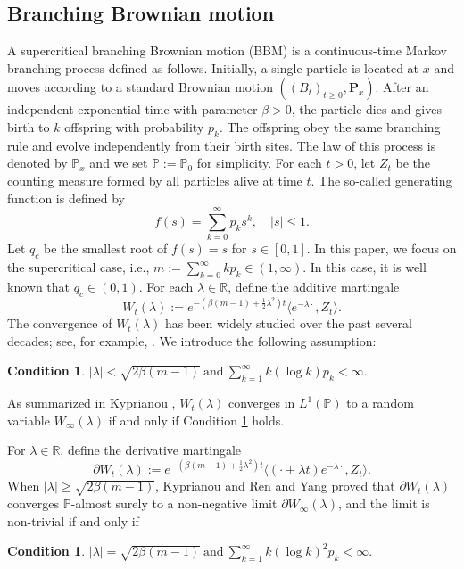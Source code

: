 \documentclass[11pt]{article}
\newtheorem{con1}[con0]{Condition}
\numberwithin{equation}{section}
\def\bgcondition{\begin{con1}}\def\edcondition{\end{con1}}
\begin{document}
\subsection{Branching Brownian motion}


A supercritical branching Brownian motion (BBM) is a continuous-time Markov branching process defined as follows. Initially, a single particle is located at $x$ and moves according to a standard Brownian motion $((B_t)_{t \geq 0}, \mathbf{P}_x)$. After an independent exponential time with parameter $\beta > 0$, the particle dies and gives birth to $k$ offspring with probability $p_k$. The offspring obey the same branching rule and evolve independently from their birth sites. The law of this process is denoted by $\mathbb{P}_x$ and we set $\mathbb{P}:= \mathbb{P}_0$ for simplicity. For each $t > 0$, let $Z_t$ be the counting measure formed by all particles alive at time 
$t$.
The so-called generating function is defined by
$$
f(s)=\sum_{k=0}^\infty p_k s^k,\quad |s|\le1.
$$
Let $q_c$ be the smallest root of $f(s)=s$ for $s\in[0,1]$. In this paper, we focus on the supercritical case, i.e., $m := \sum_{k=0}^\infty k p_k \in (1, \infty)$. In this case, it is well known that $q_c\in(0,1)$.
For each $\lambda \in \mathbb{R}$, define the additive martingale
\[
W_t(\lambda) := e^{-(\beta(m-1) + \frac{1}{2}\lambda^2)t} \langle e^{-\lambda \cdot}, Z_t \rangle.
\]
The convergence of $W_t(\lambda)$ has been widely studied over the past several decades; see, for example, \cite{Biggins, Chauvin,  Kingman, K04, Neveu}. 
We introduce the following assumption:
\bgcondition\label{cond1}
$|\lambda|< \sqrt{2\beta (m-1)} \ \mbox{and}\  \sum_{k=1}^\infty k(\log k) p_k<\infty. $
\edcondition

\noindent
As summarized in Kyprianou \cite[Theorem 1]{K04}, $W_t(\lambda)$ converges in $L^1(\mathbb{P})$ to a random variable $W_\infty(\lambda)$ if and only if Condition \ref{cond1} holds.

For $\lambda\in \mathbb{R}$, define
the derivative martingale
\[
\partial W_t(\lambda) := e^{-(\beta(m-1) + \frac{1}{2}\lambda^2)t} \langle (\cdot + \lambda t) e^{-\lambda \cdot}, Z_t \rangle.
\]
When $|\lambda| \geq \sqrt{2\beta(m-1)}$, Kyprianou \cite{K04} and Ren and Yang \cite{YR11} proved that $\partial W_t(\lambda)$ converges $\mathbb{P}$-almost surely to a non-negative limit $\partial W_\infty(\lambda)$, and the limit is non-trivial if and only if 
\bgcondition\label{cond2}
$|\lambda|= \sqrt{2\beta (m-1)} \  \mbox{and}\ \sum_{k=1}^\infty k(\log k)^2 p_k<\infty. $
\edcondition
\end{document}
